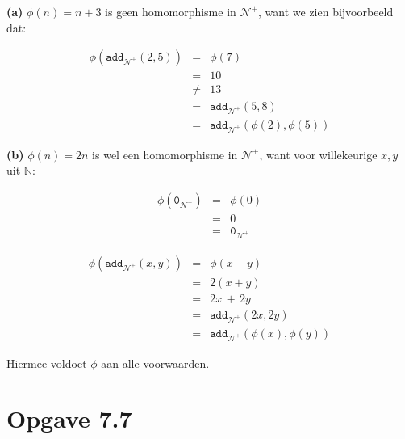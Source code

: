 \documentclass[a4paper,11pt]{article}
\begin{document}
\begin{description}

\item{\bf (a)} %
  $\phi(n) = n+3$ is geen homomorphisme in $\mathcal{N}^{+}$, want we zien
  bijvoorbeeld dat:

  \begin{eqnarray*}
    \phi(\texttt{add}_{\mathcal{N}^{+}}(2,5)) & = & \phi(7) \\
                          & = & 10 \\
                          & \ne & 13 \\
                          & = & \texttt{add}_{\mathcal{N}^{+}}(5,8) \\
                          & = & \texttt{add}_{\mathcal{N}^{+}}(\phi(2),\phi(5))
  \end{eqnarray*}

\item{\bf (b)} %
  $\phi(n) = 2n$ is wel een homomorphisme in $\mathcal{N}^{+}$, want voor
  willekeurige $x,y$ uit $\mathbb{N}$:

  \begin{eqnarray*}
    \phi(\texttt{0}_{\mathcal{N}^{+}}) & = & \phi(0) \\
                                    & = & 0 \\
                                    & = & \texttt{0}_{\mathcal{N}^{+}}
  \end{eqnarray*}

  \begin{eqnarray*}
    \phi(\texttt{add}_{\mathcal{N}^{+}}(x,y)) & = & \phi(x+y) \\
                          & = & 2(x+y) \\
                          & = & 2x \, + \, 2y \\
                          & = & \texttt{add}_{\mathcal{N}^{+}}(2x, 2y) \\
                          & = & \texttt{add}_{\mathcal{N}^{+}}(\phi(x), \phi(y))
  \end{eqnarray*}

  Hiermee voldoet $\phi$ aan alle voorwaarden.\\[2em]

\end{description}


\section*{Opgave 7.7}
\end{document}
